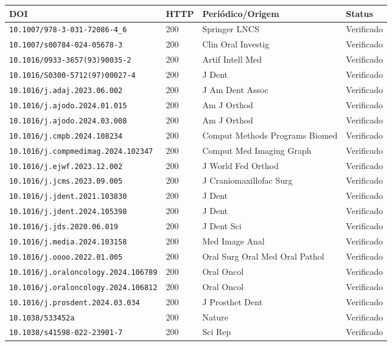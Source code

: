 \begin{longtable}{|p{3.5cm}|p{2cm}|p{6.5cm}|p{2cm}|}
\hline
\textbf{DOI} & \textbf{HTTP} & \textbf{Periódico/Origem} & \textbf{Status} \\
\hline
\endhead
\hline
\endfoot
\verb|10.1007/978-3-031-72086-4_6| & 200 & Springer LNCS & Verificado \\
\verb|10.1007/s00784-024-05678-3| & 200 & Clin Oral Investig & Verificado \\
\verb|10.1016/0933-3657(93)90035-2| & 200 & Artif Intell Med & Verificado \\
\verb|10.1016/S0300-5712(97)00027-4| & 200 & J Dent & Verificado \\
\verb|10.1016/j.adaj.2023.06.002| & 200 & J Am Dent Assoc & Verificado \\
\verb|10.1016/j.ajodo.2024.01.015| & 200 & Am J Orthod & Verificado \\
\verb|10.1016/j.ajodo.2024.03.008| & 200 & Am J Orthod & Verificado \\
\verb|10.1016/j.cmpb.2024.108234| & 200 & Comput Methods Programs Biomed & Verificado \\
\verb|10.1016/j.compmedimag.2024.102347| & 200 & Comput Med Imaging Graph & Verificado \\
\verb|10.1016/j.ejwf.2023.12.002| & 200 & J World Fed Orthod & Verificado \\
\verb|10.1016/j.jcms.2023.09.005| & 200 & J Craniomaxillofac Surg & Verificado \\
\verb|10.1016/j.jdent.2021.103830| & 200 & J Dent & Verificado \\
\verb|10.1016/j.jdent.2024.105398| & 200 & J Dent & Verificado \\
\verb|10.1016/j.jds.2020.06.019| & 200 & J Dent Sci & Verificado \\
\verb|10.1016/j.media.2024.103158| & 200 & Med Image Anal & Verificado \\
\verb|10.1016/j.oooo.2022.01.005| & 200 & Oral Surg Oral Med Oral Pathol & Verificado \\
\verb|10.1016/j.oraloncology.2024.106789| & 200 & Oral Oncol & Verificado \\
\verb|10.1016/j.oraloncology.2024.106812| & 200 & Oral Oncol & Verificado \\
\verb|10.1016/j.prosdent.2024.03.034| & 200 & J Prosthet Dent & Verificado \\
\verb|10.1038/533452a| & 200 & Nature & Verificado \\
\verb|10.1038/s41598-022-23901-7| & 200 & Sci Rep & Verificado \\

\end{longtable}
